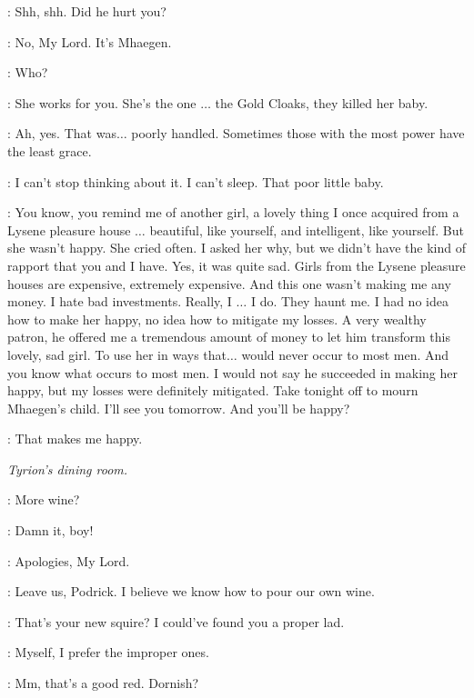 \LITTLEFINGER: Shh, shh. Did he hurt you?

\ROS: No, My Lord. It's Mhaegen.

\LITTLEFINGER: Who?

\ROS: She works for you. She's the one $\ldots$ the Gold Cloaks, they killed her baby.

\LITTLEFINGER: Ah, yes. That was$\ldots$ poorly handled. Sometimes those with the most power have the least grace.

\ROS: I can't stop thinking about it. I can't sleep. That poor little baby.

\LITTLEFINGER: You know, you remind me of another girl, a lovely thing I once acquired from a Lysene pleasure house $\ldots$ beautiful, like yourself, and intelligent, like yourself. But she wasn't happy. She cried often. I asked her why, but we didn't have the kind of rapport that you and I have. Yes, it was quite sad. Girls from the Lysene pleasure houses are expensive, extremely expensive. And this one wasn't making me any money. I hate bad investments. Really, I $\ldots$ I do. They haunt me. I had no idea how to make her happy, no idea how to mitigate my losses. A very wealthy patron, he offered me a tremendous amount of money to let him transform this lovely, sad girl. To use her in ways that$\ldots$ would never occur to most men. And you know what occurs to most men. I would not say he succeeded in making her happy, but my losses were definitely mitigated. Take tonight off to mourn Mhaegen's child. I'll see you tomorrow. And you'll be happy?


\LITTLEFINGER: That makes me happy.


\scene

\textit{Tyrion's dining room.}


\PODRICK: More wine?


\JANOSSLYNT: Damn it, boy!

\PODRICK: Apologies, My Lord.

\TYRION: Leave us, Podrick. I believe we know how to pour our own wine.

\JANOSSLYNT: That's your new squire? I could've found you a proper lad.

\TYRION: Myself, I prefer the improper ones.

\JANOSSLYNT: Mm, that's a good red. Dornish?

